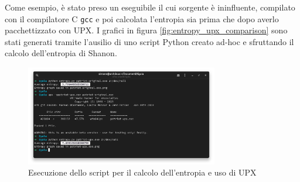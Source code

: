 Come esempio, è stato preso un eseguibile il cui sorgente è ininfluente, compilato con il compilatore C \texttt{gcc} e poi calcolata l'entropia sia prima che dopo averlo pacchettizzato con UPX. I grafici in figura \ref{fig:entropy_upx_comparison} sono stati generati tramite l'ausilio di uno script Python creato ad-hoc e sfruttando il calcolo dell'entropia di Shanon.

\begin{figure}[htbp]
    \centering
    \includegraphics[width=0.75\textwidth]{assets/entropy_script_terminal.png}
    \caption{Esecuzione dello script per il calcolo dell'entropia e uso di UPX}
    \label{fig:entropy_script_terminal}
\end{figure}

